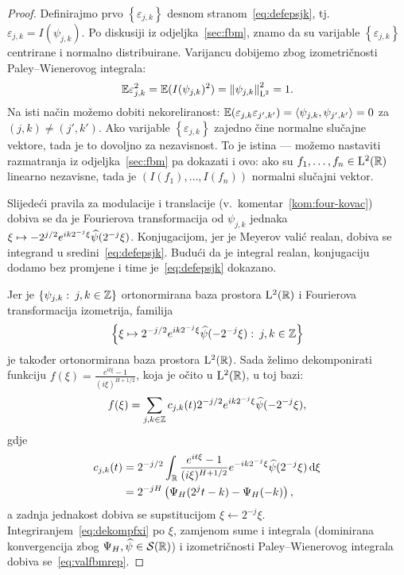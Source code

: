 \documentclass[main.tex]{subfiles}
\begin{document}
\begin{proof}
	Definirajmo prvo  \( \left\{ \varepsilon_{j,k }\right\} \) desnom stranom~\eqref{eq:defepsjk}, tj.\ \( \varepsilon_{j,k} = I(\psi_{j,k}) \).
	Po diskusiji iz odjeljka~\ref{sec:fbm}, znamo da su varijable \( \left\{ \varepsilon_{j,k} \right\} \)
	centrirane i normalno distribuirane. Varijancu dobijemo zbog izometričnosti
	Paley--Wienerovog integrala:
	\begin{equation}
		\mathbb{E}\varepsilon_{j,k}^2 = \mathbb{E}(I(\psi_{j,k})^2) = \left\lVert\psi_{j,k}\right\rVert^2_{\mathrm{L}^2} = 1.
	\end{equation}
	Na isti način možemo dobiti nekoreliranost: \( \mathbb{E} (\varepsilon_{j,k}\varepsilon_{j',k'}) = \left\langle {\psi_{j,k}}, {\psi_{j',k'}} \right\rangle = 0 \) za \( (j,k) \neq (j',k') \). Ako varijable \( \left\{ \varepsilon_{j,k}  \right\} \)
	zajedno čine normalne slučajne vektore, tada je to dovoljno za nezavisnost.
	To je istina --- možemo nastaviti razmatranja iz odjeljka~\ref{sec:fbm} pa dokazati i ovo: ako su \( f_1, \ldots, f_n \in \mathrm{L}^2(\mathbb{R}) \)
	linearno nezavisne, tada je \( \left( I(f_1),\ldots,I(f_n) \right)  \) normalni slučajni vektor.

	Slijedeći pravila za modulacije i translacije (v.~komentar~\ref{kom:four-kovac})
	dobiva se da je Fourierova transformacija od \( \psi_{j,k} \) jednaka
	\( \xi \mapsto -2^{j/2}e^{ik2^{-j}\xi}\widehat{\psi}(2^{-j}\xi) \).
	Konjugacijom, jer je Meyerov valić realan,
	dobiva se integrand u sredini~\eqref{eq:defepsjk}.
	Budući da je integral realan, konjugaciju dodamo bez promjene i time
	je~\eqref{eq:defepsjk} dokazano.

	Jer je \( \left\{ \psi_{j,k} \, \colon \, j,k \in \mathbb{Z} \right\} \) ortonormirana baza
	prostora \( \mathrm{L}^2(\mathbb{R}) \) i Fourierova transformacija izometrija, familija
	\[
		\left\{ \xi \mapsto 2^{-j/2} e^{ik2^{-j}\xi}\widehat{\psi}(-2^{-j}\xi) \, \colon \, j,k \in \mathbb{Z} \right\}
	\]
	je također ortonormirana baza prostora \( \mathrm{L}^2(\mathbb{R}) \). Sada želimo dekomponirati
	funkciju \( f(\xi) = \frac{e^{it\xi}-1}{(i\xi)^{H+1/2}} \), koja je očito u \( \mathrm{L}^2(\mathbb{R}) \), u toj bazi:
	\begin{equation} \label{eq:dekompfxi}
		f(\xi) =
		\sum_{j,k \in \mathbb{Z}} c_{j,k}(t) 2^{-j/2}e^{ik2^{-j}\xi}\widehat{\psi}(-2^{-j}\xi),
	\end{equation}
	gdje
	\begin{equation}
		\begin{aligned}
			c_{j,k}(t) & = 2^{-j/2} \int_{\mathbb{R}} \frac{e^{it\xi}-1}{(i\xi)^{H+1/2}}e^{-ik2^{-j}\xi}\widehat{\psi}(2^{-j}\xi) \,\mathrm d \xi
			\\ &= 2^{-jH} \left( \Psi_H(2^jt-k)-\Psi_H(-k) \right),
		\end{aligned}
	\end{equation}
	a zadnja jednakost dobiva se supstitucijom \( \xi \leftarrow 2^{-j}\xi \).
	Integriranjem~\eqref{eq:dekompfxi} po \( \xi \), zamjenom sume i integrala (dominirana konvergencija zbog \( \Psi_H, \widehat{\psi} \in \mathcal S(\mathbb{R}) \)) i izometričnosti Paley--Wienerovog integrala
	dobiva se~\eqref{eq:valfbmrep}.


\end{proof}
\end{document}
